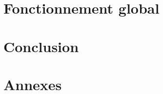 \documentclass[a4paper]{article} %
\begin{document}
\section{Fonctionnement global}
\section{Conclusion}
\section{Annexes}
\end{document}
